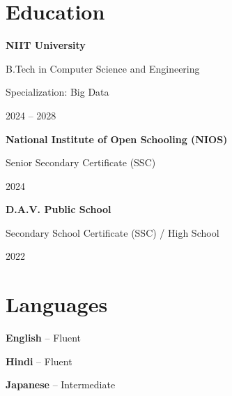 \documentclass[a4paper,10pt]{article}
\newlength{\sidebarwidth}
\newlength{\bodyheight}
\begin{document}
\begin{minipage}[t]{\sidebarwidth}
{\begin{minipage}[t][\bodyheight][s]{\dimexpr\sidebarwidth-2\fboxsep\relax}
\section*{Education}
\textbf{NIIT University}\par
B.Tech in Computer Science and Engineering\par
Specialization: Big Data\par
2024 -- 2028\par\vspace{7pt}
\textbf{National Institute of Open Schooling (NIOS)}\par
Senior Secondary Certificate (SSC)\par
2024\par\vspace{7pt}
\textbf{D.A.V. Public School}\par
Secondary School Certificate (SSC) / High School\par
2022
\vfill

\section*{Languages}
\textbf{English} -- Fluent\par\vspace{5pt}
\textbf{Hindi} -- Fluent\par\vspace{5pt}
\textbf{Japanese} -- Intermediate
\end{minipage}%
}
\end{minipage}\hfill%
\end{document}
